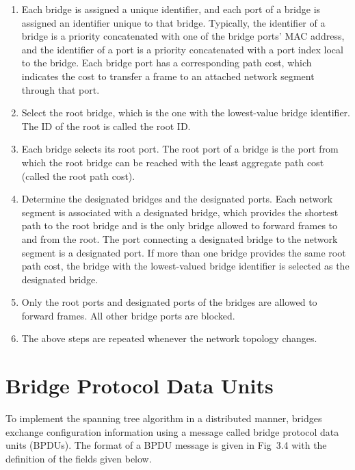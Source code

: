 \documentclass{UTNetLab}
\begin{document}
\begin{enumerate}
	\item Each bridge is assigned a unique identifier, and each port of a bridge is assigned an identifier unique to that bridge. Typically, the identifier of a bridge is a priority concatenated with one of the bridge ports’ MAC
	address, and the identifier of a port is a priority concatenated with a port index local to the bridge.
	Each bridge port has a corresponding path cost, which indicates the cost to transfer a frame to an attached network segment through that port.
	
	\item Select the root bridge, which is the one with the lowest-value bridge identifier.
	The ID of the root is called the root ID.
	
	\item Each bridge selects its root port.
	The root port of a bridge is the port from which the root bridge can be reached with the least aggregate path cost (called the root path cost).
	
	\item Determine the designated bridges and the designated ports.
	Each network segment is associated with a designated bridge, which provides the shortest path to the root bridge and is the only bridge allowed to forward frames to and from the root.
	The port connecting a designated bridge to the network segment is a designated port.
	If more than one bridge provides the same root path cost, the bridge with the lowest-valued bridge identifier is selected as the designated bridge.
	
	\item Only the root ports and designated ports of the bridges are allowed to forward frames.
	All other bridge ports are blocked.
	
	\item The above steps are repeated whenever the network topology changes.
\end{enumerate}

\section{Bridge Protocol Data Units}
\label{appendix:bpdu}
To implement the spanning tree algorithm in a distributed manner, bridges exchange configuration information using a message called bridge
protocol data units (BPDUs).
The format of a BPDU message is given in Fig~3.4 with the definition of the fields given below.
\end{document}
